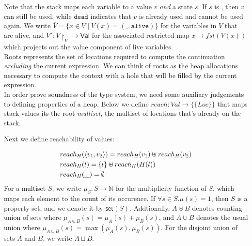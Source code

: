 \documentclass[11pt]{article}
\newcommand{\ms}[1]{\ensuremath{\mathsf{#1}}}
\newcommand{\irl}[1]{\mathtt{#1}}
\begin{document}
\noindent
Note that the stack maps each variable to a value $v$ \emph{and} a state $s$. If $s$ is \irl{alive}, then $v$ can still be used, while $\irl{dead}$ indicates that $v$ is already used and cannot be used again. We write $\overline V = \{x \in V \mid V(x) = (\_,\irl{alive}) \}$ for the variables in $V$ that are alive, and $V^{\star} : V {\restriction_{\overline V}} \to \ms{Val}$ for the associated restricted map $x \mapsto fst(V(x))$ which projects out the value component of live variables.\\ 

\noindent
Roots represents the set of locations required to compute the continuation \emph{excluding} the current expression.
We can think of roots as the heap allocations necessary to compute the context with a hole that will be filled
by the current expression.\\

\noindent
In order prove soundness of the type system, we need some auxiliary judgements to defining properties of a heap. Below we define $reach : Val \to \{\{Loc\}\}$ that maps stack values its the root \emph{multiset}, the multiset of locations that's already on the stack. 

\noindent
Next we define reachability of values:

\begin{align*}
&reach_H(\langle v_1, v_2\rangle) = reach_H(v_1) \uplus reach_H(v_2)\\
&reach_H(l) = \{l\} \uplus reach_H(H(l))\\
&reach_H(\_) = \emptyset
\end{align*}
For a multiset $S$, we write $\mu_S : S \to \mathbb{N}$ for the multiplicity function of $S$, which maps each element to the count of its occurence. If $\forall s \in S. \mu(s) = 1$, then $S$ is a property set, and we denote it by $\ms{set}(S)$. Addtionally, $A \uplus B$ denotes counting union of sets where $\mu_{A \uplus B} (s) = \mu_A (s) + \mu_B (s)$, and $A \cup B$ denotes the usual union where $\mu_{A \cup B}(s) = \max{(\mu_A(s),\mu_B(s))}$. For the disjoint union of sets $A$ and $B$, we write $A \sqcup B$.\\
\end{document}
